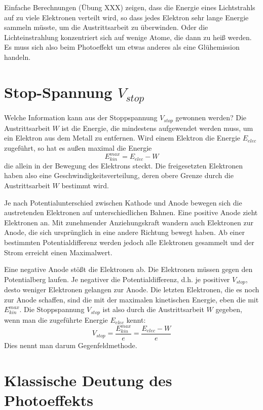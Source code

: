 Einfache Berechnungen (Übung XXX) zeigen, dass die Energie eines Lichtstrahls auf zu viele Elektronen verteilt wird, so dass jedes Elektron sehr lange Energie sammeln müsste, um die Austrittsarbeit zu überwinden. Oder die Lichteinstrahlung konzentriert sich auf wenige Atome, die dann zu heiß werden. Es muss sich also beim Photoeffekt um etwas anderes als eine Glühemission handeln.

\section{Stop-Spannung  $V_{stop}$ }

Welche Information kann aus der Stoppspannung $V_{stop}$ gewonnen werden? Die Austrittsarbeit $W$ ist die Energie, die mindestens aufgewendet werden muss, um ein Elektron aus dem Metall zu entfernen. Wird einem Elektron die Energie $E_{elec}$ zugeführt, so hat es außen maximal die Energie 
\begin{equation}
    E_{kin}^{max} = E_{elec} - W
\end{equation}
die allein in der Bewegung des Elektrons steckt. Die freigesetzten Elektronen haben also eine Geschwindigkeitsverteilung, deren obere Grenze durch die Austrittsarbeit $W$ bestimmt wird.

Je nach Potentialunterschied zwischen Kathode und Anode bewegen sich die austretenden Elektronen auf unterschiedlichen Bahnen. Eine positive Anode zieht Elektronen an. Mit zunehmender Anziehungskraft wandern auch Elektronen zur Anode, die sich ursprünglich in eine andere Richtung bewegt haben. Ab einer bestimmten Potentialdifferenz werden jedoch alle Elektronen gesammelt und der Strom erreicht einen Maximalwert.

Eine negative Anode stößt die Elektronen ab. Die Elektronen müssen gegen den Potentialberg laufen. Je negativer die Potentialdifferenz, d.h. je positiver $V_{stop}$, desto weniger Elektronen gelangen zur Anode. Die letzten Elektronen, die es noch zur Anode schaffen, sind die mit der maximalen kinetischen Energie, eben die mit $ E_{kin}^{max}$. Die Stoppspannung $V_{stop}$ ist also durch die Austrittsarbeit $W$ gegeben, wenn man die zugeführte Energie $E_{elec}$ kennt:
\begin{equation}
    V_{stop} = \frac{E_{kin}^{max}}{e} = \frac{E_{elec} - W}{e}  
\end{equation}
Dies nennt man darum Gegenfeldmethode.


\section{Klassische Deutung des Photoeffekts}


